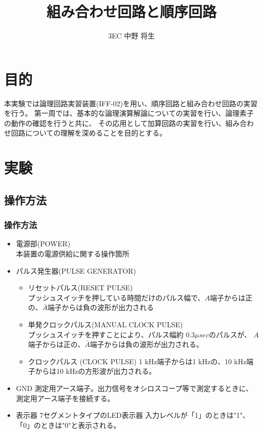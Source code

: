\documentclass[dvipdfmx]{jsarticle}
\begin{document}
	\title{組み合わせ回路と順序回路}
	\author{3EC 中野 将生}
	\maketitle
	\section{目的}
		本実験では論理回路実習装置(IFF-02)を用い、順序回路と組み合わせ回路の実習を行う。
		第一周では、基本的な論理演算解論についての実習を行い、論理素子の動作の確認を行うと共に、
		その応用として加算回路の実習を行い、組み合わせ回路についての理解を深めることを目的とする。
	\section{実験}
		\subsection{操作方法}
			\subsubsection{操作方法}
				\begin{itemize}
					\item 電源部(POWER) \\
						本装置の電源供給に関する操作箇所
					\item パルス発生器(PULSE GENERATOR)
						\begin{itemize}
							\item リセットパルス(RESET PULSE) \\
								プッシュスイッチを押している時間だけのパルス幅で、$A$端子からは正の、$\bar{A}$端子からは負の波形が出力される
							\item 単発クロックパルス(MANUAL CLOCK PULSE) \\
								プッシュスイッチを押すことにより、パルス幅約 $0.3 \mu sec$のパルスが、
								$A$端子からは正の、$\bar{A}$端子からは負の波形が出力される。
							\item クロックパルス (CLOCK PULSE)
								1 kHz端子からは1 kHzの、10 kHz端子からは10 kHzの方形波が出力される。
						\end{itemize}
					\item GND
						測定用アース端子。出力信号をオシロスコープ等で測定するときに、測定用アース端子を接続する。
					\item 表示器
						7セグメントタイプのLED表示器
						入力レベルが「1」のときは"1"、「0」のときは"0"と表示される。
				\end{itemize}
\end{document}

